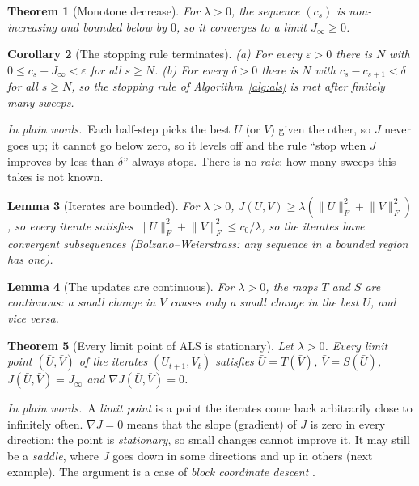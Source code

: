 \documentclass[10pt]{article}
\theoremstyle{plain}
\newtheorem{theorem}{Theorem}[section]
\newtheorem{lemma}[theorem]{Lemma}
\newtheorem{corollary}[theorem]{Corollary}
\theoremstyle{definition}
\theoremstyle{remark}
\newcommand{\fro}[1]{\lVert #1\rVert_F}
\newcommand{\plain}{\noindent\emph{In plain words.}\ }
\begin{document}
\begin{theorem}[Monotone decrease]\label{thm:mono}
For $\lambda>0$, the sequence $(c_s)$ is non-increasing and bounded below by $0$, so it converges to a limit $J_\infty\ge0$.
\end{theorem}

\begin{corollary}[The stopping rule terminates]\label{cor:eps}
(a) For every $\varepsilon>0$ there is $N$ with $0\le c_s-J_\infty<\varepsilon$ for all $s\ge N$.
(b) For every $\delta>0$ there is $N$ with $c_s-c_{s+1}<\delta$ for all $s\ge N$, so the stopping rule of Algorithm~\ref{alg:als} is met after finitely many sweeps.
\end{corollary}

\plain Each half-step picks the best $U$ (or $V$) given the other, so $J$ never goes up; it cannot go below zero, so it levels off and the rule ``stop when $J$ improves by less than $\delta$'' always stops. There is no \emph{rate}: how many sweeps this takes is not known.

\begin{lemma}[Iterates are bounded]\label{lem:coer}
For $\lambda>0$, $J(U,V)\ge\lambda(\fro U^2+\fro V^2)$, so every iterate satisfies $\fro U^2+\fro V^2\le c_0/\lambda$, so the iterates have convergent subsequences (Bolzano--Weierstrass: any sequence in a bounded region has one).
\end{lemma}

\begin{lemma}[The updates are continuous]\label{lem:cont}
For $\lambda>0$, the maps $T$ and $S$ are continuous: a small change in $V$ causes only a small change in the best $U$, and vice versa.
\end{lemma}

\begin{theorem}[Every limit point of ALS is stationary]\label{thm:stat}
Let $\lambda>0$. Every limit point $(\bar U,\bar V)$ of the iterates $(U_{t+1},V_t)$ satisfies
$\bar U=T(\bar V)$, $\bar V=S(\bar U)$, $J(\bar U,\bar V)=J_\infty$ and $\nabla J(\bar U,\bar V)=0$.
\end{theorem}

\plain A \emph{limit point} is a point the iterates come back arbitrarily close to infinitely often. $\nabla J=0$ means that the slope (gradient) of $J$ is zero in every direction: the point is \emph{stationary}, so small changes cannot improve it. It may still be a \emph{saddle}, where $J$ goes down in some directions and up in others (next example). The argument is a case of \emph{block coordinate descent} \cite{grippo2000}.
\end{document}

